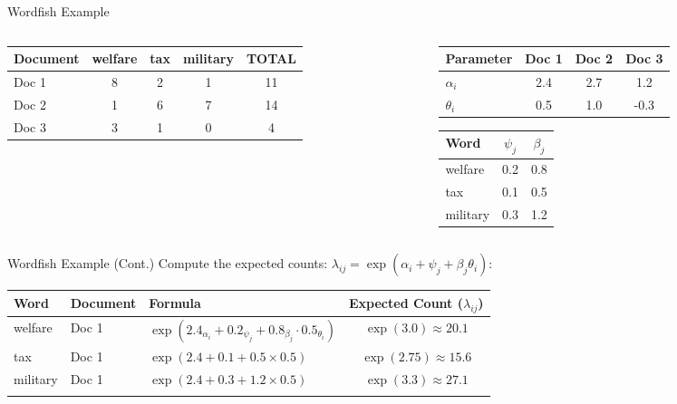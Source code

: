 \documentclass[
  ignorenonframetext,
  aspectratio=169]{beamer}
\begin{document}
\begin{frame}{Wordfish Example}
\label{wordfish-example}
\begin{columns}[T]
    \footnotesize
    \begin{column}{0.4\textwidth}
    \begin{tabular}{lcccc}
    \toprule
    Document & welfare & tax & military & TOTAL \\
    \midrule
    Doc 1 & 8 & 2 & 1 & 11 \\
    Doc 2 & 1 & 6 & 7 & 14 \\
    Doc 3 & 3 & 1 & 0 & 4 \\
    \bottomrule
    \end{tabular}
    \end{column}
    \begin{column}{0.6\textwidth}
    \centering
    \footnotesize
    \begin{tabular}{lccc}
\toprule
Parameter & Doc 1 & Doc 2 & Doc 3 \\
\midrule
$\alpha_i$ & 2.4 & 2.7 & 1.2 \\
$\theta_i$ & 0.5 & 1.0 & -0.3 \\
\bottomrule
\end{tabular} \par \vspace{2.5mm}
\begin{tabular}{lcc}
\toprule
Word & $\psi_j$ & $\beta_j$ \\
\midrule
welfare & 0.2 & 0.8 \\
tax & 0.1 & 0.5 \\
military & 0.3 & 1.2 \\
\bottomrule
\end{tabular}
    \end{column}
\end{columns}
\end{frame}

\begin{frame}{Wordfish Example (Cont.)}
\label{wordfish-example-cont.}
Compute the expected counts:
\(\lambda_{ij} = \exp(\alpha_i + \psi_j + \beta_j\theta_i)\):

\par \vspace{2.5mm}

\begin{tabular}{lllc}
\toprule
Word & Document & Formula & Expected Count ($\lambda_{ij}$) \\
\midrule
welfare  & Doc 1 & $\exp(2.4_{\alpha_i} + 0.2_{\psi_j} + 0.8_{\beta_j}\cdot 0.5_{\theta_i})$ & $\exp(3.0) \approx 20.1$ \\
tax      & Doc 1 & $\exp(2.4 + 0.1 + 0.5 \times 0.5)$ & $\exp(2.75) \approx 15.6$ \\
military & Doc 1 & $\exp(2.4 + 0.3 + 1.2 \times 0.5)$ & $\exp(3.3) \approx 27.1$ \\
\addlinespace
\bottomrule
\end{tabular}
\end{frame}
\end{document}
